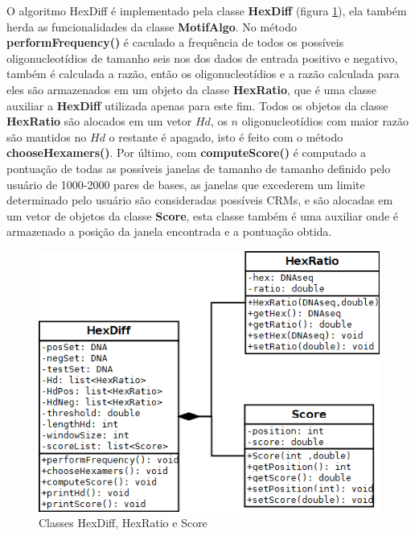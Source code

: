O algoritmo HexDiff é implementado pela classe \textbf{HexDiff} (figura \ref{fig:HexDiff}), ela também herda as funcionalidades da classe \textbf{MotifAlgo}. No método \textbf{performFrequency()} é caculado a frequência de todos os possíveis oligonucleotídios de tamanho seis nos dos dados de entrada positivo e negativo, também é calculada a razão, então os oligonucleotídios  e a razão calculada para eles são armazenados em um objeto da classe \textbf{HexRatio}, que é uma classe auxiliar a \textbf{HexDiff} utilizada apenas para este fim. Todos os objetos da classe \textbf{HexRatio} são alocados em um vetor $Hd$, os $n$ oligonucleotídios com maior razão são mantidos no $Hd$ o restante é apagado, isto é feito com o método \textbf{chooseHexamers()}. Por último, com \textbf{computeScore()} é computado a pontuação de todas as possíveis janelas de tamanho de tamanho definido pelo usuário de 1000-2000 pares de bases, as janelas que excederem um limite determinado pelo usuário são consideradas possíveis CRMs, e são alocadas em um vetor de objetos da classe \textbf{Score}, esta classe também é uma auxiliar onde é armazenado a posição da janela encontrada e a pontuação obtida.

\begin{figure}[htb!]
    \centering
    \includegraphics[scale=0.7]{./imagens/HexDiff.png}
    \caption{Classes HexDiff, HexRatio e Score}
    \label{fig:HexDiff}
\end{figure}
